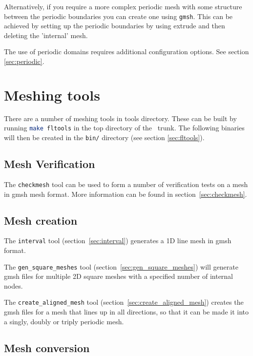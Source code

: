 Alternatively, if you require a more complex periodic mesh with some structure between the periodic
boundaries you can create one using \lstinline[language=Bash]{gmsh}. This can be achieved by
setting up the periodic boundaries by using extrude and then deleting the 'internal' mesh.

The use of periodic domains requires additional configuration options. See
section \ref{sec:periodic}.

\section{Meshing tools}
\label{sec:meshing_tools}

There are a number of meshing tools in tools directory. These can be built by running
\lstinline[language = bash]+make fltools+ in the top directory of the \fluidity\ trunk.
The following binaries will then be created in the \lstinline+bin/+ directory (see section \ref{sec:fltools}).

\subsection{Mesh Verification}

The \lstinline[language = Bash]+checkmesh+ tool can be used to form a number of verification tests on a mesh
in gmsh mesh format. More information can be found in section~\ref{sec:checkmesh}.

\subsection{Mesh creation}
The \lstinline[language = bash]+interval+ tool (section~\ref{sec:interval}) generates a 1D line mesh in gmsh format.

The \lstinline[language = bash]+gen_square_meshes+ tool (section~\ref{sec:gen_square_meshes})  will generate gmsh files for multiple 2D square meshes with a specified number of internal nodes.

The \lstinline[language = bash]+create_aligned_mesh+ tool (section~\ref{sec:create_aligned_mesh}) creates the gmsh files for a mesh that lines up in all directions, so that it can be made it into a singly, doubly or triply periodic mesh.

\subsection{Mesh conversion}


